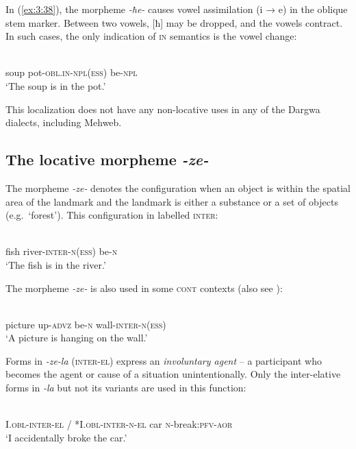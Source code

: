 ﻿\documentclass[output=paper]{langsci/langscibook}
\begin{document}
In (\ref{ex:3:38}), the morpheme \emph{-ħe-} causes vowel assimilation (i → e) in
the oblique stem marker. Between two vowels, [ħ] may be dropped, and
the vowels contract. In such cases, the only indication of \textsc{in}
semantics is the vowel change:

\ea
{}\\
soup pot-\textsc{obl}.\textsc{in}-\textsc{npl}(\textsc{ess}) be-\textsc{npl}\\
\glt `The soup is in the pot.'
\z

This localization does not have any non-locative uses in any of the
Dargwa dialects, including Mehweb.

\subsection{The locative morpheme \emph{-ze-}}
\label{the-locative-morpheme-ze}

The morpheme \emph{-ze-} denotes the configuration when an object is
within the spatial area of the landmark and the landmark is either a
substance or a set of objects (e.g.\ `forest'). This configuration in
labelled \textsc{inter}:

\ea
{}\\
fish river-\textsc{inter}-\textsc{n}(\textsc{ess}) be-\textsc{n}\\
\glt `The fish is in the river.'
\z

The morpheme \emph{-ze-} is also used in some \textsc{cont} contexts
(also see ):

\ea
{}\\
picture up-\textsc{advz} be-\textsc{n} wall-\textsc{inter}-\textsc{n}(\textsc{ess})\\
\glt `A picture is hanging on the wall.'
\z

Forms in \emph{-ze-la} (\textsc{inter}-\textsc{el}) express an \emph{involuntary
agent} – a participant who becomes the agent or cause of a situation
unintentionally. Only the inter-elative forms in \emph{-la} but not its
variants are used in this function:

\ea \label{ex:3:42}
\\
I.\textsc{obl}-\textsc{inter}-\textsc{el} / *I.\textsc{obl}-\textsc{inter}-\textsc{n}-\textsc{el} car \textsc{n}-break:\textsc{pfv}-\textsc{aor}\\
\glt `I accidentally broke the car.'
\z
\end{document}

